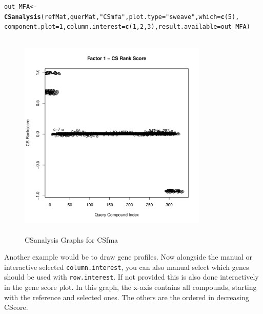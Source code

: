 \documentclass[a4paper]{article}\usepackage[]{graphicx}\usepackage[]{color}
\makeatletter
\newcommand{\hlnum}[1]{\textcolor[rgb]{0.686,0.059,0.569}{#1}}%
\newcommand{\hlstr}[1]{\textcolor[rgb]{0.192,0.494,0.8}{#1}}%
\newcommand{\hlstd}[1]{\textcolor[rgb]{0.345,0.345,0.345}{#1}}%
\newcommand{\hlkwb}[1]{\textcolor[rgb]{0.69,0.353,0.396}{#1}}%
\newcommand{\hlkwc}[1]{\textcolor[rgb]{0.333,0.667,0.333}{#1}}%
\newcommand{\hlkwd}[1]{\textcolor[rgb]{0.737,0.353,0.396}{\textbf{#1}}}%
\newenvironment{kframe}{%
 \def\at@end@of@kframe{}%
 \ifinner\ifhmode%
  \def\at@end@of@kframe{\end{minipage}}%
  \begin{minipage}{\columnwidth}%
 \fi\fi%
 \def\FrameCommand##1{\hskip\@totalleftmargin \hskip-\fboxsep
 \colorbox{shadecolor}{##1}\hskip-\fboxsep
     \hskip-\linewidth \hskip-\@totalleftmargin \hskip\columnwidth}%
 \MakeFramed {\advance\hsize-\width
   \@totalleftmargin\z@ \linewidth\hsize
   \@setminipage}}%
 {\par\unskip\endMakeFramed%
 \at@end@of@kframe}
\newenvironment{knitrout}{}{} %
\makeatother
\begin{document}
\begin{knitrout}
\color{fgcolor}\begin{kframe}
\begin{alltt}
        \hlstd{out_MFA} \hlkwb{<-} \hlkwd{CSanalysis}\hlstd{(refMat,querMat,}\hlstr{"CSmfa"}\hlstd{,}\hlkwc{plot.type}\hlstd{=}\hlstr{"sweave"}\hlstd{,}\hlkwc{which}\hlstd{=}\hlkwd{c}\hlstd{(}\hlnum{5}\hlstd{),}
                        \hlkwc{component.plot}\hlstd{=}\hlnum{1}\hlstd{,}\hlkwc{column.interest}\hlstd{=}\hlkwd{c}\hlstd{(}\hlnum{1}\hlstd{,}\hlnum{2}\hlstd{,}\hlnum{3}\hlstd{),}\hlkwc{result.available}\hlstd{=out_MFA)}
\end{alltt}
\end{kframe}\begin{figure}[H]


\includegraphics[width=9cm,height=10cm]{figure/MFA2-1} \hfill{}

\caption[CSanalysis Graphs for CSfma]{CSanalysis Graphs for CSfma\label{fig:MFA2}}
\end{figure}


\end{knitrout}
\noindent Another example would be to draw gene profiles. Now alongside the
manual or interactive selected \texttt{column.interest}, you can also manual
select which genes should be used with \texttt{row.interest}. If not provided
this is also done interactively in the gene score plot. In this graph, the
x-axis contains all compounds, starting with the reference and selected ones.
The others are the ordered in decreasing CScore.
\end{document}
